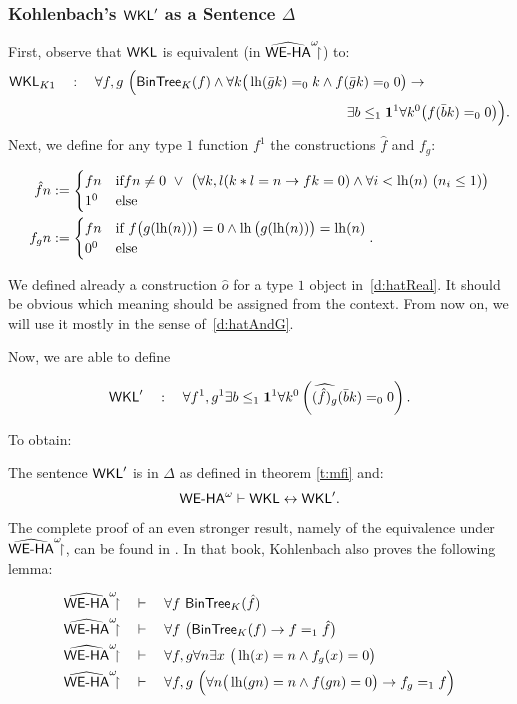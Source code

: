 \subsubsection*{Kohlenbach's $\textsf{\upshape WKL}'$ as a Sentence $\Delta$}\label{ss:delta}
First, observe that $\textsf{\upshape WKL}$ is equivalent (in $\widehat{\textsf{\upshape WE-HA}}^\omega\!\!\!\restriction$) to:
\begin{align*}
\textsf{\upshape WKL}_{K1}\quad:\quad
  \forall f,g\ \Big( \textsf{\upshape BinTree}_K(f)\wedge\forall k\big(\operatorname{lh}(\bar gk)=_0k\wedge f(\bar gk)=_00\big)
    &\rightarrow \\
  \exists b\leq_1 \mathbf1^1\forall &k^0\big(f(\bar bk)=_00\big)\Big)\text{.}
\end{align*}
Next, we define for any type $1$ function $f^1$ the constructions $\hat f$ and $f_g$:
\begin{dfn}\label{d:hatAndG}
\begin{align*}
\hat fn&:=\begin{cases}
  fn &\Tif fn\neq0\ \vee\ 
       \big(\forall k,l(k*l=n\rightarrow fk=0)\wedge \forall i<\lh(n)\ (n_i\leq 1)\big)\\
  1^0 &\Telse \end{cases}\\
f_gn&:=\begin{cases}
  fn &\Tif\ f\big(g(\lh(n))\big)=0\wedge \lh\big(g(\lh(n))\big)=\lh(n)\\
  0^0 &\Telse \end{cases}
\text{.}
\end{align*}
\end{dfn}
\begin{rmk}
We defined already a construction $\hat o$ for a type $1$ object in~\ref{d:hatReal}. It
should be obvious which meaning should be assigned from the context. From now on,
we will use it mostly in the sense of~\ref{d:hatAndG}.
\end{rmk}
Now, we are able to define
\begin{dfn}
\[
\textsf{\upshape WKL}'\quad:\quad \forall f^1,g^1\exists b\leq_1\mathbf1^1\forall k^0
  \left(\widehat{(\hat f)_g} (\bar bk)=_00\right)\text{.}
\]
\end{dfn}
To obtain:
\begin{prop}\label{p:wkls1}
The sentence $\textsf{\upshape WKL}'$ is in $\Delta$ as defined in theorem \ref{t:mfi} and:
\[ {\textsf{\upshape WE-HA}}^{\omega}\vdash\textsf{\upshape WKL}\leftrightarrow\textsf{\upshape WKL}' 
\text{.}
\]
\end{prop}
The complete proof of an even stronger result, namely of the equivalence under $\widehat{\textsf{\upshape WE-HA}}^\omega\!\!\!\restriction$, can
be found in \cite{Kohlenbach08}. In that book, Kohlenbach also proves the following
lemma:
\begin{lemma} \label{l:hatg}
  \setcounter{equation}{0}
  \begin{align}
    \hrrweha\quad&\proves\quad \forall f\ \BTree_K(\hat{f})\\
    \hrrweha\quad&\proves\quad \forall f\ \big(\BTree_K(f)\rightarrow f=_1\hat f\big)\\
    \hrrweha\quad&\proves\quad \forall f,g\forall n\exists x\ \big(\lh(x)=n\wedge f_g(x)=0\big)\\
    \hrrweha\quad&\proves\quad \forall f,g\ 
          \Big(\forall n\big(\lh(gn)=n\wedge f(gn)=0\big)\rightarrow f_g=_1 f\Big)
  \end{align}
\end{lemma}
